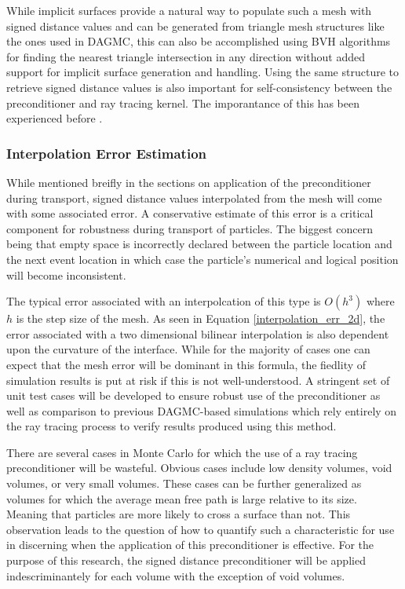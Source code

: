 \documentclass[12pt, a4paper]{article}
\begin{document}
While implicit surfaces provide a natural way to populate such a mesh with signed distance values and can be generated from triangle mesh structures like the ones used in DAGMC, this can also be accomplished using BVH algorithms for finding the nearest triangle intersection in any direction without added support for implicit surface generation and handling. Using the same structure to retrieve signed distance values is also important for self-consistency between the preconditioner and ray tracing kernel. The imporantance of this has been experienced before \cite{Smith_2011}.

\subsubsection{Interpolation Error Estimation}

While mentioned breifly in the sections on application of the preconditioner during transport, signed distance values interpolated from the mesh will come with some associated error. A conservative estimate of this error is a critical component for robustness during transport of particles. The biggest concern being that empty space is incorrectly declared between the particle location and the next event location in which case the particle's numerical and logical position will become inconsistent.

The typical error associated with an interpolcation of this type is $O(h^3)$ where $h$ is the step size of the mesh. As seen in Equation \ref{interpolation_err_2d}, the error associated with a two dimensional bilinear interpolation is also dependent upon the curvature of the interface. While for the majority of cases one can expect that the mesh error will be dominant in this formula, the fiedlity of simulation results is put at risk if this is not well-understood. A stringent set of unit test cases will be developed to ensure robust use of the preconditioner as well as comparison to previous DAGMC-based simulations which rely entirely on the ray tracing process to verify results produced using this method.

There are several cases in Monte Carlo for which the use of a ray tracing preconditioner will be wasteful. Obvious cases include low density volumes, void volumes, or very small volumes. These cases can be further generalized as volumes for which the average mean free path is large relative to its size. Meaning that particles are more likely to cross a surface than not. This observation leads to the question of how to quantify such a characteristic for use in discerning when the application of this preconditioner is effective. For the purpose of this research, the signed distance preconditioner will be applied indescriminantely for each volume with the exception of void volumes.
\end{document}
